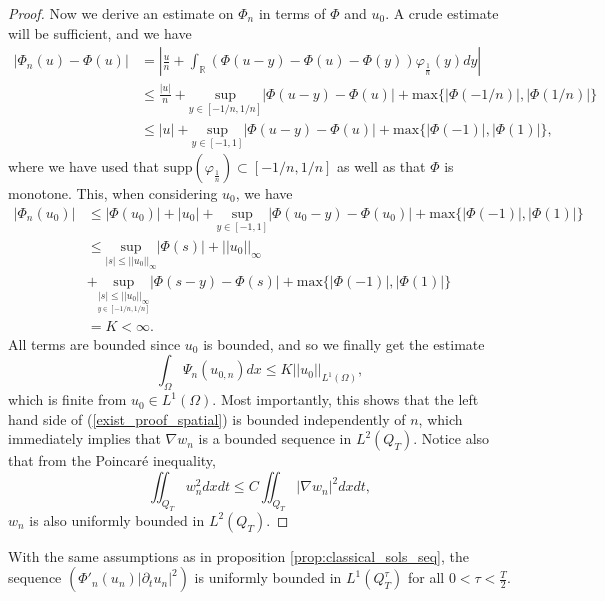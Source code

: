 \documentclass[11pt, a4paper]{article}
\begin{document}
\begin{proof}
	Now we derive an estimate on $\Phi_n$ in terms of $\Phi$ and $u_0$. A crude estimate will be sufficient, and we have
	\begin{align*}
	|\Phi_n(u) - \Phi(u)| &= \left|\frac{u}{n} + \int_\mathbb{R}\left( \Phi(u-y) - \Phi(u) - \Phi(y)\right)\varphi_{\frac{1}{n}}(y)dy \right| \\
	&\leq \frac{|u|}{n} + \underset{y\in [-1/n, 1/n]}{\mathrm{sup}}|\Phi(u-y) - \Phi(u)| + \mathrm{max}\{|\Phi(-1/n)|, |\Phi(1/n)|\} \\
	&\leq |u| + \underset{y\in [-1, 1]}{\mathrm{sup}}|\Phi(u-y) - \Phi(u)| +\mathrm{max}\{|\Phi(-1)|, |\Phi(1)|\},
	\end{align*}
	where we have used that $\mathrm{supp}(\varphi_{\frac{1}{n}})\subset [-1/n, 1/n]$ as well as that $\Phi$ is monotone. This, when considering $u_0$, we have
	\begin{align*}
	|\Phi_n(u_0)| &\leq |\Phi(u_0)| + |u_0| + \underset{y\in [-1, 1]}{\mathrm{sup}}|\Phi(u_0-y) - \Phi(u_0)| +\mathrm{max}\{|\Phi(-1)|, |\Phi(1)|\} \\
	& \leq \underset{|s| \leq ||u_0||_\infty}{\mathrm{sup}}|\Phi(s)| + ||u_0||_{\infty}\\
	& + \underset{\underset{y\in[-1/n,1/n]}{|s| \leq ||u_0||_{\infty}}}{\mathrm{sup}}|\Phi(s-y) - \Phi(s)| + \mathrm{max}\{|\Phi(-1)|, |\Phi(1)|\} \\
	&= K < \infty.
	\end{align*}
	All terms are bounded since $u_0$ is bounded, and so we finally get the estimate
	\begin{equation*}
	\int_\Omega \Psi_n(u_{0,n})dx \leq K ||u_0||_{L^1(\Omega)},
	\end{equation*}
	which is finite from $u_0 \in L^1(\Omega)$. Most importantly, this shows that the left hand side of (\ref{exist_proof_spatial}) is bounded independently of $n$, which immediately implies that $\nabla w_n$ is a bounded sequence in $L^2(Q_T)$. Notice also that from the Poincaré inequality,
	\begin{equation*}
	\iint_{Q_T}w_n^2 dxdt \leq C\iint_{Q_T} |\nabla w_n|^2dxdt,	
	\end{equation*}
	$w_n$ is also uniformly bounded in $L^2(Q_T)$.
\end{proof}

\begin{proposition}
\label{prop:temporal_bound}
With the same assumptions as in proposition \ref{prop:classical_sols_seq}, the sequence $(\Phi'_n(u_n) |\partial_t u_n|^2)$ is uniformly bounded in $L^1(Q_T^\tau)$ for all $0 < \tau < \frac{T}{2}$.
\end{proposition}
\end{document}

